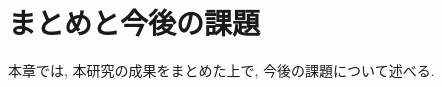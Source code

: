 \newpage
\changeindent{0cm}
\section{まとめと今後の課題}
\changeindent{2cm}

本章では, 本研究の成果をまとめた上で, 今後の課題について述べる.
